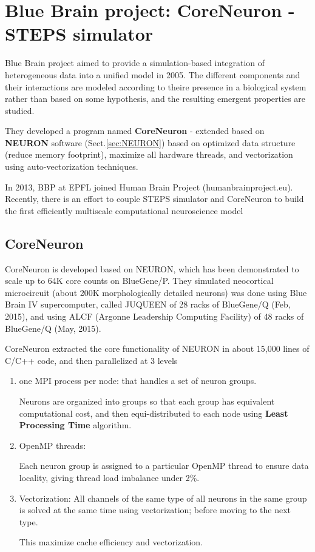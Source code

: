 \chapter{Blue Brain project: CoreNeuron - STEPS simulator}
\label{chap:CoreNeuron}

Blue Brain project aimed to provide a simulation-based integration of
heterogeneous data into a unified model in 2005. The different components and
their interactions are modeled according to theire presence in a biological
system rather than based on some hypothesis, and the resulting emergent
properties are studied.

They developed a program named {\bf CoreNeuron} - extended based on {\bf NEURON}
software (Sect.\ref{sec:NEURON}) based on optimized data structure (reduce
memory footprint), maximize all hardware threads, and vectorization using
auto-vectorization techniques.

In 2013, BBP at EPFL joined Human Brain Project (humanbrainproject.eu).
Recently, there is an effort to couple STEPS simulator and CoreNeuron to build
the first efficiently multiscale computational neuroscience model

\section{CoreNeuron}
\label{sec:CoreNeuron}

CoreNeuron is developed based on NEURON, which has been demonstrated to scale
up to 64K core counts on BlueGene/P. They simulated neocortical microcircuit
(about 200K morphologically detailed neurons) was done using Blue Brain IV
supercomputer, called JUQUEEN of 28 racks of BlueGene/Q (Feb, 2015), and using
ALCF (Argonne Leadership Computing Facility) of 48 racks of BlueGene/Q (May,
2015).


CoreNeuron extracted the core functionality of NEURON in about 15,000 lines of
C/C++ code, and then parallelized at 3 levels
\begin{enumerate}
  \item one MPI process per node:
    that handles a set of neuron groups.
  
  Neurons are organized into groups so that each group has equivalent
  computational cost, and then equi-distributed to each node using {\bf Least
  Processing Time} algorithm.
  
  \item OpenMP threads:
  
  Each neuron group is assigned to a particular OpenMP thread to ensure data
  locality, giving thread load imbalance under 2\%.
  
  \item Vectorization: All channels of the same type of all neurons in the same
  group is solved at the same time using vectorization; before moving to the
  next type.
  
  This maximize cache efficiency and vectorization.
  
\end{enumerate}

